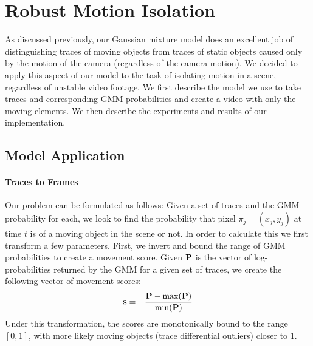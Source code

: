 \section{Robust Motion Isolation} 
\label{sec:motion}

As discussed previously, our Gaussian mixture model does an excellent job of
distinguishing traces of moving objects from traces of static objects caused
only by the motion of the camera (regardless of the camera motion).  We decided
to apply this aspect of our model to the task of isolating motion in a scene,
regardless of unstable video footage.  We first describe the model we use to
take traces and corresponding GMM probabilities and create a video with only the
moving elements.  We then describe the experiments and results of our
implementation.

\subsection{Model Application} %
\label{sub:Model Application}

\paragraph{Traces to Frames} %
\label{par:Traces to Frames}

Our problem can be formulated as follows: Given a set of traces and the GMM
probability for each, we look to find the probability that pixel $\pi_j =
(x_j,y_j)$ at time $t$ is of a moving object in the scene or not.  In order to
calculate this we first transform a few parameters.  First, we invert and bound
the range of GMM probabilities to create a movement score.  Given ${\bf
P}$ is the vector of log-probabilities returned by the GMM for a given set of
traces, we create the following vector of movement scores:
\begin{align}
	{\bf s} = - \frac{ {\bf P} - {\rm max}({\bf P}) }{ {\rm min}({\bf P}) }
\end{align}
Under this transformation, the scores are monotonically bound to the range $[0,1]$, with
more likely moving objects (trace differential outliers) closer to 1. 

